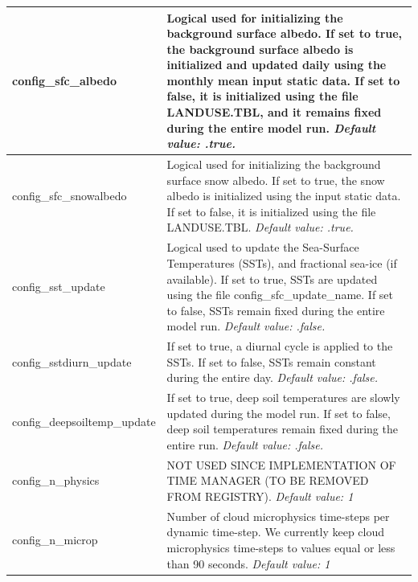 \documentclass[11pt]{report}
\begin{document}
{\begin{longtable}{|p{2.0in} |p{4.25in}|}
  config\_sfc\_albedo & Logical used for initializing the background surface albedo. If set to true, the background surface albedo is initialized and updated daily using the monthly mean input static data. If set to false, it is initialized using the file LANDUSE.TBL, and it remains fixed during the entire model run. \newline 
  {\em Default value: .true.} \\ \hline
  
    config\_sfc\_snowalbedo & Logical used for initializing the background surface snow albedo. If set to true, the snow albedo is initialized using the input static data. 
    If set to false, it is initialized using the file LANDUSE.TBL.\newline 
  {\em Default value: .true.} \\ \hline

  config\_sst\_update & Logical used to update the Sea-Surface Temperatures (SSTs), and fractional sea-ice (if available). If set to true, SSTs are updated using the file config\_sfc\_update\_name. If set to false, SSTs remain fixed during the entire model run. \newline 
  {\em Default value: .false.} \\ \hline

  config\_sstdiurn\_update & If set to true, a diurnal cycle is applied to the SSTs. If set to false, SSTs remain constant during the entire day.\newline 
  {\em Default value: .false.} \\ \hline

  config\_deepsoiltemp\_update & If set to true, deep soil temperatures are slowly updated during the model run. If set to false, deep soil temperatures remain fixed during the entire run. \newline 
  {\em Default value: .false.} \\ \hline

  config\_n\_physics & NOT USED SINCE IMPLEMENTATION OF TIME MANAGER (TO BE REMOVED FROM REGISTRY). \newline 
  {\em Default value: 1} \\ \hline

  config\_n\_microp & Number of cloud microphysics time-steps per dynamic time-step. We currently keep cloud microphysics time-steps to values equal or less than 90 seconds. \newline 
  {\em Default value: 1} \\ \hline
  

\end{longtable}}
\end{document}
